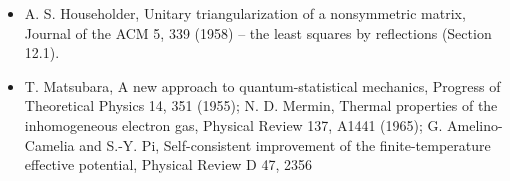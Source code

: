 \documentclass[
  10pt,
]{article}
\begin{document}
\begin{itemize}
  degrees of freedom in alkali atom gases, Journal of the Physical
  Society of Japan 67, 1822 (1998); A. J. Leggett, A theoretical
  description of the new phases of liquid \(^3\)He, Reviews of Modern
  Physics 47, 331 (1975); P. G. de Gennes, Short range order effects in
  the isotropic phase of nematics and cholesterics, Molecular Crystals
  and Liquid Crystals 12, 193 (1971) -- the examples of Landau forms
  (Section 12.1).
\item
  A. S. Householder, Unitary triangularization of a nonsymmetric matrix,
  Journal of the ACM 5, 339 (1958) -- the least squares by reflections
  (Section 12.1).
\item
  T. Matsubara, A new approach to quantum-statistical mechanics,
  Progress of Theoretical Physics 14, 351 (1955); N. D. Mermin, Thermal
  properties of the inhomogeneous electron gas, Physical Review 137,
  A1441 (1965); G. Amelino-Camelia and S.-Y. Pi, Self-consistent
  improvement of the finite-temperature effective potential, Physical
  Review D 47, 2356


\end{itemize}
\end{document}
